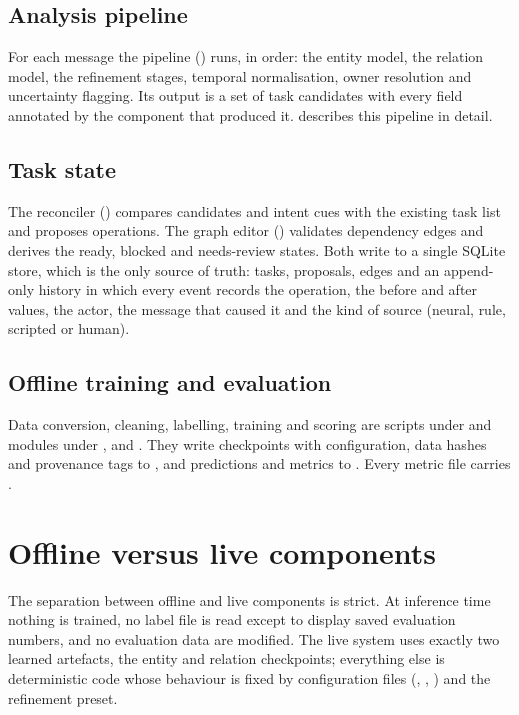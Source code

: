 \subsection{Analysis pipeline}
For each message the pipeline () runs, in order: the entity model, the relation model, the refinement stages, temporal normalisation, owner resolution and uncertainty flagging. Its output is a set of task candidates with every field annotated by the component that produced it.  describes this pipeline in detail.

\subsection{Task state}
The reconciler () compares candidates and intent cues with the existing task list and proposes operations. The graph editor () validates dependency edges and derives the ready, blocked and needs-review states. Both write to a single SQLite store, which is the only source of truth: tasks, proposals, edges and an append-only history in which every event records the operation, the before and after values, the actor, the message that caused it and the kind of source (neural, rule, scripted or human).

\subsection{Offline training and evaluation}
Data conversion, cleaning, labelling, training and scoring are scripts under  and modules under ,  and . They write checkpoints with configuration, data hashes and provenance tags to , and predictions and metrics to . Every metric file carries .

\section{Offline versus live components}
The separation between offline and live components is strict. At inference time nothing is trained, no label file is read except to display saved evaluation numbers, and no evaluation data are modified. The live system uses exactly two learned artefacts, the entity and relation checkpoints; everything else is deterministic code whose behaviour is fixed by configuration files (, , ) and the refinement preset.

